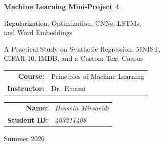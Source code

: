 \documentclass[11pt,a4paper]{article}
\begin{document}
\begin{titlepage}
\centering
\vspace*{2cm}
{\Huge\bfseries Machine Learning Mini-Project 4\par}
\vspace{0.8cm}
{\LARGE Regularization, Optimization, CNNs, LSTMs,\\[0.3cm]
and Word Embeddings\par}
\vspace{1.2cm}
{\large A Practical Study on Synthetic Regression, MNIST,\\[0.2cm]
CIFAR-10, IMDB, and a Custom Text Corpus\par}
\vspace{2.5cm}

\begin{tabular}{rl}
    \textbf{Course:}      & Principles of Machine Learning \\[0.2em]
    \textbf{Instructor:}  & Dr.~Emami           \\[0.2em]
\end{tabular}
\vspace{2cm}

\begin{tabular}{rl}
\textbf{Name:} & {\textit{Hossein Mirsaeidi}}\\[0.2em]
\textbf{Student ID:} & {\textit{403211408}}\\[0.2em]
\end{tabular}

\vfill
{\large Summer 2026\par}
\vspace{1cm}
\end{titlepage}

\begin{abstract}
\noindent
This project studies several core ideas of modern deep learning through five connected
tasks. First, I write the forward and backward equations of a small feedforward network
and carry out one update step by hand. Second, I train a multilayer perceptron on a noisy
cubic function and compare early stopping with dropout. Third, I train an MLP on MNIST and
contrast the SGD and Adam optimizers. Fourth, I build a convolutional network for CIFAR-10
image classification and a long short-term memory network for IMDB sentiment analysis, and
I compare their behaviour. Fifth, I implement a Continuous Bag-of-Words model and visualise
the learned word embeddings, both directly in two dimensions and in ten dimensions reduced
by PCA. Throughout, the focus is on careful evaluation and a clear discussion of why each
method behaves the way it does. All experiments use TensorFlow/Keras and were run on a
4~GB GPU.
\end{abstract}
\end{document}
